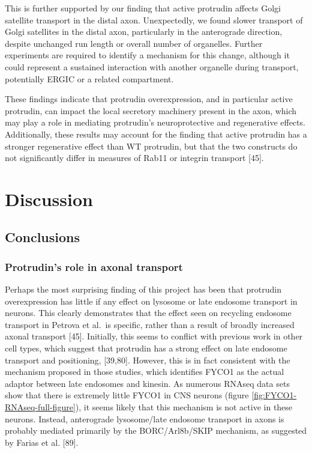 \documentclass[
  12pt,
  a4paper,
]{book}
\begin{document}
This is further supported by our finding that active protrudin affects Golgi satellite transport in the distal axon. Unexpectedly, we found slower transport of Golgi satellites in the distal axon, particularly in the anterograde direction, despite unchanged run length or overall number of organelles. Further experiments are required to identify a mechanism for this change, although it could represent a sustained interaction with another organelle during transport, potentially ERGIC or a related compartment.

These findings indicate that protrudin overexpression, and in particular active protrudin, can impact the local secretory machinery present in the axon, which may play a role in mediating protrudin's neuroprotective and regenerative effects. Additionally, these results may account for the finding that active protrudin has a stronger regenerative effect than WT protrudin, but that the two constructs do not significantly differ in measures of Rab11 or integrin transport {[}45{]}.

\hypertarget{DISCUSSION}{%
\chapter*{Discussion}\label{DISCUSSION}}

\setcounter{chapter}{4}
\setcounter{section}{0}
\setcounter{figure}{0}

\hypertarget{conclusions}{%
\section{Conclusions}\label{conclusions}}

\hypertarget{protrudins-role-in-axonal-transport}{%
\subsection{Protrudin's role in axonal transport}\label{protrudins-role-in-axonal-transport}}

Perhaps the most surprising finding of this project has been that protrudin overexpression has little if any effect on lysosome or late endosome transport in neurons. This clearly demonstrates that the effect seen on recycling endosome transport in Petrova et al.~is specific, rather than a result of broadly increased axonal transport {[}45{]}. Initially, this seems to conflict with previous work in other cell types, which suggest that protrudin has a strong effect on late endosome transport and positioning, {[}39,80{]}. However, this is in fact consistent with the mechanism proposed in those studies, which identifies FYCO1 as the actual adaptor between late endosomes and kinesin. As numerous RNAseq data sets show that there is extremely little FYCO1 in CNS neurons (figure \ref{fig:FYCO1-RNAseq-full-figure}), it seems likely that this mechanism is not active in these neurons. Instead, anterograde lysosome/late endosome transport in axons is probably mediated primarily by the BORC/Arl8b/SKIP mechanism, as suggested by Farias et al. {[}89{]}.
\end{document}
